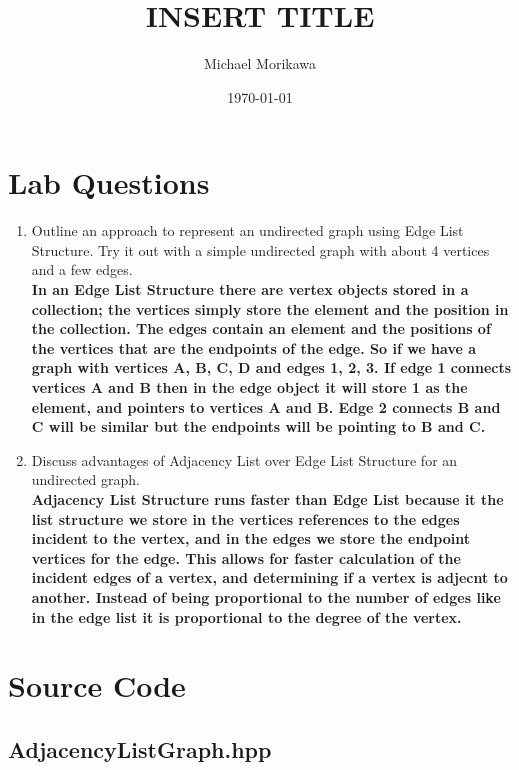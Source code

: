 \documentclass{article}
\title{INSERT TITLE}
\author{Michael Morikawa}
\date{\today}
\begin{document}
\maketitle
\section{Lab Questions}
\begin{enumerate}[label=\textbf{Question \arabic*}]
      \item  Outline an approach to represent an undirected graph using Edge List
            Structure. Try it out with a simple undirected graph with about 4 vertices and a few
            edges. \\
            \textbf{
                  In an Edge List Structure there are vertex objects stored in a collection; the vertices
                  simply store the element and the position in the collection. The edges contain an element
                  and the positions of the vertices that are the endpoints of the edge. So if we have a graph with
                  vertices A, B, C, D and edges 1, 2, 3. If edge 1 connects vertices A and B then in the edge object
                  it will store 1 as the element, and pointers to vertices A and B. Edge 2 connects B and C will be similar but
                  the endpoints will be pointing to B and C.
            }
      \item Discuss advantages of Adjacency List over Edge List Structure for an
            undirected graph.\\
            \textbf{
                  Adjacency List Structure runs faster than Edge List because it the list structure
                  we store in the vertices references to the edges incident to the vertex, and in
                  the edges we store the endpoint vertices for the edge. This allows for faster calculation
                  of the incident edges of a vertex, and determining if a vertex is adjecnt to another. Instead
                  of being proportional to the number of edges like in the edge list it is proportional to the
                  degree of the vertex.
            }


\end{enumerate}

\section{Source Code}

\subsection{AdjacencyListGraph.hpp}
\inputminted{c++}{../include/AdjacencyListGraph.hpp}
\end{document}
